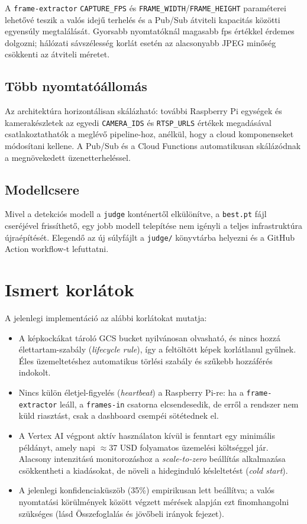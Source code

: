 A \texttt{frame-extractor} \texttt{CAPTURE\_FPS} és \texttt{FRAME\_WIDTH}/\texttt{FRAME\_HEIGHT} paraméterei
lehetővé teszik a valós idejű terhelés és a Pub/Sub átviteli kapacitás közötti egyensúly megtalálását.
Gyorsabb nyomtatóknál magasabb fps értékkel érdemes dolgozni; hálózati sávszélesség korlát esetén
az alacsonyabb JPEG minőség csökkenti az átviteli méretet.

\subsection{Több nyomtatóállomás}

Az architektúra horizontálisan skálázható: további Raspberry Pi egységek és kamerakészletek az egyedi
\texttt{CAMERA\_IDS} és \texttt{RTSP\_URLS} értékek megadásával csatlakoztathatók a meglévő pipeline-hoz,
anélkül, hogy a cloud komponenseket módosítani kellene. A Pub/Sub és a Cloud Functions automatikusan skálázódnak
a megnövekedett üzenetterheléssel.

\subsection{Modellcsere}

Mivel a detekciós modell a \texttt{judge} konténertől elkülönítve, a \texttt{best.pt} fájl cseréjével frissíthető,
egy jobb modell telepítése nem igényli a teljes infrastruktúra újraépítését. Elegendő az új súlyfájlt
a \texttt{judge/} könyvtárba helyezni és a GitHub Action workflow-t lefuttatni.

\section{Ismert korlátok}

A jelenlegi implementáció az alábbi korlátokat mutatja:

\begin{itemize}
    \item A képkockákat tároló GCS bucket nyilvánosan olvasható, és nincs hozzá élettartam-szabály (\textit{lifecycle rule}),
          így a feltöltött képek korlátlanul gyűlnek. Éles üzemeltetéshez automatikus törlési szabály és szűkebb hozzáférés indokolt.
    \item Nincs külön életjel-figyelés (\textit{heartbeat}) a Raspberry Pi-re: ha a \texttt{frame-extractor} leáll, a \texttt{frames-in}
          csatorna elcsendesedik, de erről a rendszer nem küld riasztást, csak a dashboard csempéi sötétednek el.
    \item A Vertex AI végpont aktív használaton kívül is fenntart egy minimális példányt, amely napi
          $\approx$37 USD folyamatos üzemelési költséggel jár. Alacsony intenzitású monitorozáshoz
          a \textit{scale-to-zero} beállítás alkalmazása csökkentheti a kiadásokat, de növeli a hideginduló
          késleltetést (\textit{cold start}).
    \item A jelenlegi konfidenciaküszöb (35\%) empirikusan lett beállítva; a valós nyomtatási körülmények
          között végzett mérések alapján ezt finomhangolni szükséges (lásd Összefoglalás és jövőbeli irányok fejezet).
\end{itemize}
